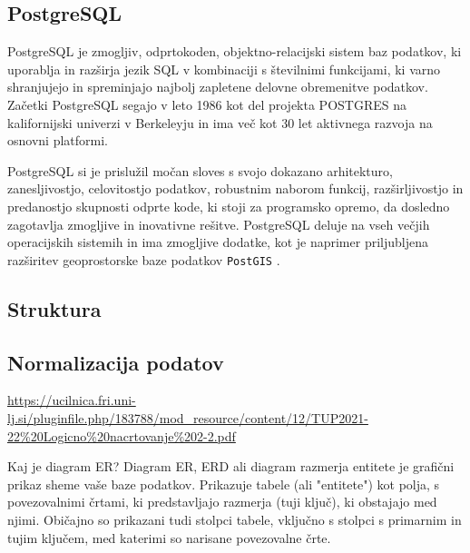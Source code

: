 \documentclass[a4paper, 12pt]{book}
\begin{document}
\subsection{PostgreSQL}
PostgreSQL je zmogljiv, odprtokoden, objektno-relacijski sistem baz podatkov, ki uporablja in razširja jezik SQL v kombinaciji s številnimi funkcijami, ki varno shranjujejo in spreminjajo najbolj zapletene delovne obremenitve podatkov. Začetki PostgreSQL segajo v leto 1986 kot del projekta POSTGRES na kalifornijski univerzi v Berkeleyju in ima več kot 30 let aktivnega razvoja na osnovni platformi.

PostgreSQL si je prislužil močan sloves s svojo dokazano arhitekturo, zanesljivostjo, celovitostjo podatkov, robustnim naborom funkcij, razširljivostjo in predanostjo skupnosti odprte kode, ki stoji za programsko opremo, da dosledno zagotavlja zmogljive in inovativne rešitve. 
PostgreSQL deluje na vseh večjih operacijskih sistemih in ima zmogljive dodatke, kot je naprimer priljubljena razširitev geoprostorske baze podatkov \verb=PostGIS= \cite{pg-database-postgis}.

\subsection{ Struktura }
\subsection{ Normalizacija podatov }
\url{https://ucilnica.fri.uni-lj.si/pluginfile.php/183788/mod_resource/content/12/TUP2021-22%20Logicno%20nacrtovanje%202-2.pdf}

Kaj je diagram ER? Diagram ER, ERD ali diagram razmerja entitete je grafični prikaz sheme vaše baze podatkov. Prikazuje tabele (ali "entitete") kot polja, s povezovalnimi črtami, ki predstavljajo razmerja (tuji ključ), ki obstajajo med njimi. Običajno so prikazani tudi stolpci tabele, vključno s stolpci s primarnim in tujim ključem, med katerimi so narisane povezovalne črte.
\end{document}
